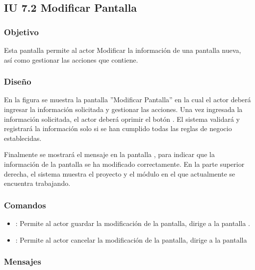 \subsection{IU 7.2 Modificar Pantalla}

\subsubsection{Objetivo}
	Esta pantalla permite al actor Modificar la información de una pantalla nueva, así como gestionar las acciones que contiene.
\subsubsection{Diseño}
	En la figura  se muestra la pantalla ''Modificar Pantalla'' en la cual el actor deberá ingresar la información solicitada y gestionar las acciones.
	Una vez ingresada la información solicitada, el actor deberá oprimir el botón  . El sistema validará y registrará la información solo si se han cumplido todas las reglas de negocio establecidas.
	
	Finalmente se mostrará el mensaje  en la pantalla , para indicar que la información de la pantalla se ha modificado correctamente.
	En la parte superior derecha, el sistema muestra el proyecto y el módulo en el que actualmente se encuentra trabajando.

\subsubsection{Comandos}
\begin{itemize}
	\item {}: Permite al actor guardar la modificación de la pantalla, dirige a la pantalla .
	\item {}: Permite al actor cancelar la modificación de la pantalla, dirige a la pantalla 
\end{itemize}

\subsubsection{Mensajes}

